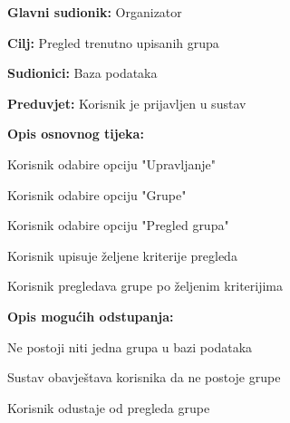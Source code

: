 					\noindent {}
					\begin{packed_item}
						
						\item \textbf{Glavni sudionik: }Organizator
						\item  \textbf{Cilj:} Pregled trenutno upisanih grupa
						\item  \textbf{Sudionici:} Baza podataka
						\item  \textbf{Preduvjet:} Korisnik je prijavljen u sustav
						\item  \textbf{Opis osnovnog tijeka:}
						
						\item[] \begin{packed_enum}
							
							\item Korisnik odabire opciju "Upravljanje"
							\item Korisnik odabire opciju "Grupe"
							\item Korisnik odabire opciju "Pregled grupa"
							\item Korisnik upisuje željene kriterije pregleda
							\item Korisnik pregledava grupe po željenim kriterijima
						\end{packed_enum}
						
						\item  \textbf{Opis mogućih odstupanja:}
						
						\item[] \begin{packed_item}
							
							\item[2.a] Ne postoji niti jedna grupa u bazi podataka
							\item[] \begin{packed_enum}
								
								\item Sustav obavještava korisnika da ne postoje grupe
								\item Korisnik odustaje od pregleda grupe
								
							\end{packed_enum}						
						\end{packed_item}
					\end{packed_item}
				
